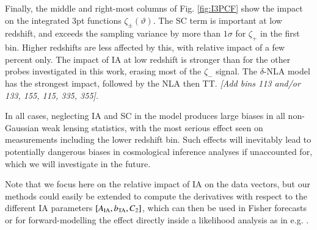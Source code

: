 Finally, the middle and right-most columns of Fig. \ref{fig:I3PCF} show the impact on the integrated 3pt functions $\zeta_\pm(\vartheta)$. The SC term is important at low redshift, and exceeds the sampling variance by more than $1\sigma$ for $\zeta_+$ in the first bin. Higher redshifts are less affected by this, with relative impact of a few percent only.  The impact of IA at low redshift is stronger than for the other probes investigated in this work, erasing most of the $\zeta_-$ signal. The $\delta$-NLA model has the strongest impact, followed by the NLA then TT.   {\it [Add bins 113 and/or 133, 155, 115, 335, 355].}

In all cases, neglecting IA and SC in the model  produces large biases in all non-Gaussian weak lensing statistics, with the most serious effect seen on measurements including the lower redshift bin. Such effects will inevitably lead to potentially dangerous biases in cosmological inference analyses if unaccounted for, which we will investigate in the future.

Note that we focus here on the relative impact  of IA on the data vectors, but our methods could easily be extended to compute the derivatives with respect to the different IA parameters $[A_{\rm IA}, b_{\rm TA}, C_2]$, which can then be used in Fisher forecasts or for forward-modelling the effect directly inside  a likelihood analysis  as in e.g. \citet{DESY1_Heydenreich, KiDS1000_Burger, KiDS1000_JHD}. %
